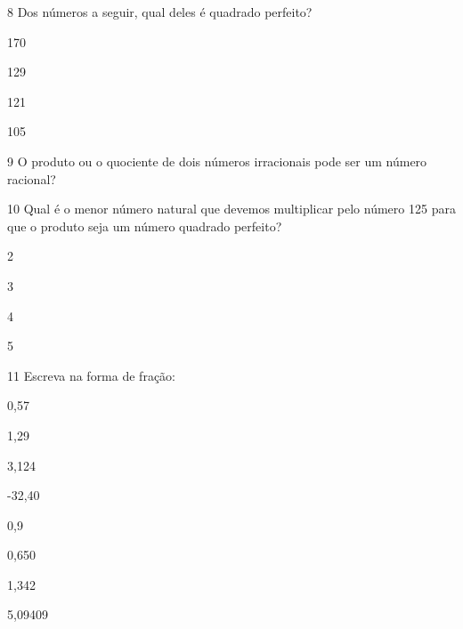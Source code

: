 

\num{8} Dos números a seguir, qual deles é quadrado perfeito?

\begin{escolha} 
\item 170
\item 129
\item 121 
\item 105
\end{escolha}




\num{9} O produto ou o quociente de dois números irracionais pode ser um
número racional?



\num{10} Qual é o menor número natural que devemos multiplicar pelo número
125 para que o produto seja um número quadrado perfeito?

\begin{escolha}
\item 
2
\item 
3
\item
4
\item 
5
\end{escolha}


\num{11} Escreva na forma de fração:
\begin{escolha} 

\item 0,57
\item 1,29
\item 3,124
\item -32,40
\item 0,9
\item 0,650
\item 1,342
\item 5,09409
\end{escolha}

